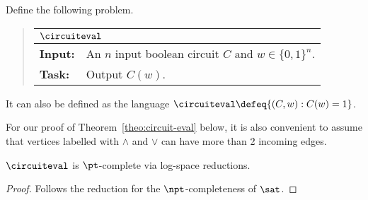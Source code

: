 \documentclass[11pt, a4paper]{article}
\begin{document}
Define the following problem.
\begin{quote}
{\def\arraystretch{1.25}
\begin{tabular}{|ll|}
\hline
\multicolumn{2}{|l|}{$\circuiteval$}
\\
\hline
{\bf Input:}
&
An $n$ input boolean circuit $C$ and $w\in \{0,1\}^n$.
\\
{\bf Task:}
&
Output $C(w)$.
\\
\hline
\end{tabular}}
\end{quote}
It can also be defined as the language $\circuiteval \defeq \{ (C,w) : C(w) = 1\}$.



For our proof of Theorem~\ref{theo:circuit-eval} below, 
it is also convenient to assume that vertices labelled with $\wedge$ and $\vee$
can have more than 2 incoming edges.


\begin{theorem}
\label{theo:circuit-eval}
$\circuiteval$ is $\pt$-complete via log-space reductions.
\end{theorem}
\begin{proof}
Follows the reduction for the $\npt$-completeness of $\sat$.
\end{proof}
\end{document}
